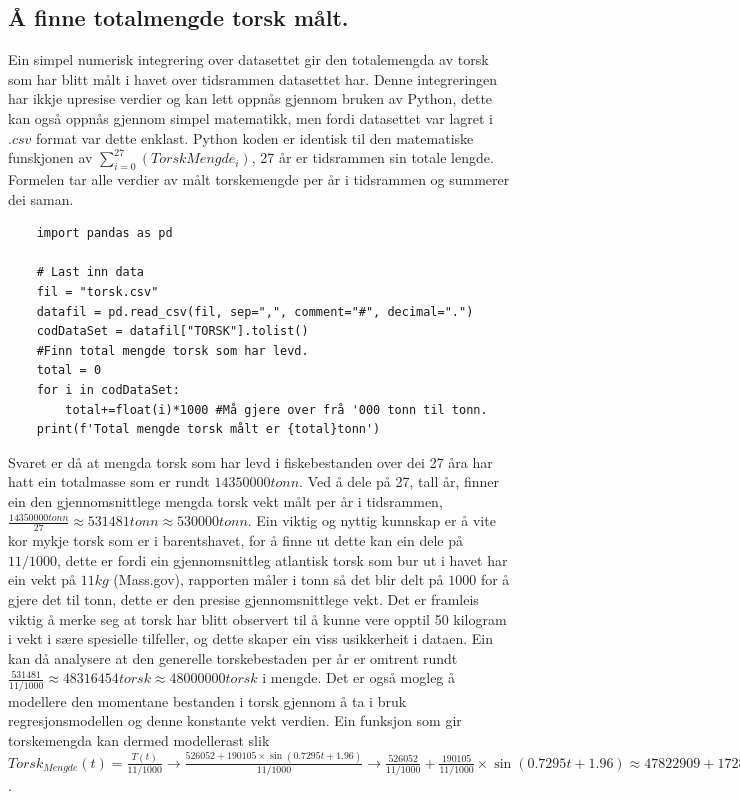 \documentclass{report}
\begin{document}
\subsection{Å finne totalmengde torsk målt.}
Ein simpel numerisk integrering over datasettet gir den totalemengda av torsk som har blitt målt i havet over tidsrammen datasettet har.
Denne integreringen har ikkje upresise verdier og kan lett oppnås gjennom bruken av Python, dette kan også oppnås gjennom simpel matematikk, men fordi datasettet var lagret i $.csv$ format var dette enklast.
Python koden er identisk til den matematiske funskjonen av $\sum _{i=0} ^{27} (TorskMengde_{i})$, 27 år er tidsrammen sin totale lengde. Formelen tar alle verdier av målt torskemengde per år i tidsrammen og summerer dei saman.
\begin{verbatim}
    import pandas as pd

    # Last inn data
    fil = "torsk.csv"
    datafil = pd.read_csv(fil, sep=",", comment="#", decimal=".")
    codDataSet = datafil["TORSK"].tolist()
    #Finn total mengde torsk som har levd.
    total = 0
    for i in codDataSet:
        total+=float(i)*1000 #Må gjere over frå '000 tonn til tonn.
    print(f'Total mengde torsk målt er {total}tonn')
\end{verbatim}
Svaret er då at mengda torsk som har levd i fiskebestanden over dei 27 åra har hatt ein totalmasse som er rundt $14350000tonn$.
Ved å dele på 27, tall år, finner ein den gjennomsnittlege mengda torsk vekt målt per år i tidsrammen, $\frac{14350000tonn}{27}\approx 531481tonn \approx 530000tonn$.
Ein viktig og nyttig kunnskap er å vite kor mykje torsk som er i barentshavet, for å finne ut dette kan ein dele på $11/1000$, dette er fordi ein gjennomsnittleg atlantisk torsk som bur ut i havet har ein vekt på $11kg$ (Mass.gov), rapporten måler i tonn så det blir delt på $1000$ for å gjere det til tonn, dette er den presise gjennomsnittlege vekt.
Det er framleis viktig å merke seg at torsk har blitt observert til å kunne vere opptil 50 kilogram i vekt i sære spesielle tilfeller, og dette skaper ein viss usikkerheit i dataen.
Ein kan då analysere at den generelle torskebestaden per år er omtrent rundt $\frac{531481}{11/1000}\approx 48316454torsk \approx 48000000torsk$ i mengde.
Det er også mogleg å modellere den momentane bestanden i torsk gjennom å ta i bruk regresjonsmodellen og denne konstante vekt verdien.
Ein funksjon som gir torskemengda kan dermed modellerast slik $Torsk_{Mengde}(t)=\frac{T(t)}{11/1000} \rightarrow\frac{526052+190105\times \sin(0.7295t+1.96)}{11/1000}\rightarrow\frac{526052}{11/1000} + \frac{190105}{11/1000}\times \sin(0.7295t+1.96)\approx 47822909+17282272\times \sin(0.7295t+1.96)$.
\end{document}
